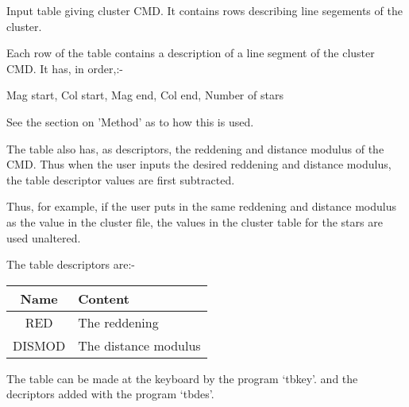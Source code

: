 \begin{small}
{{  Input table giving cluster CMD. It contains rows describing line
  segements of the cluster.

\begin{list}{{-}}{}
\item Each row of the table contains a description of a line segment of
      the cluster CMD. It has, in order,:-

      Mag start, Col start, Mag end, Col end, Number of stars


\item See the section on 'Method' as to how this is used.


\item The table also has, as descriptors, the reddening and distance modulus
      of the CMD. Thus when the user inputs the desired reddening and
      distance modulus, the table descriptor values are first subtracted.

      Thus, for example, if the user puts in the same reddening and distance
      modulus as the value in the cluster file, the values in the cluster
      table for the stars are used unaltered.

      The table descriptors are:-

\begin{tabular}{|c|l|}\hline
      Name   &  Content \\ \hline
      RED    &  The reddening \\
      DISMOD &  The distance modulus \\ \hline
\end{tabular}

\item The table can be made at the keyboard by the program `tbkey'.
      and the decriptors added with the program `tbdes'.
\end{list}

}}
\end{small}
